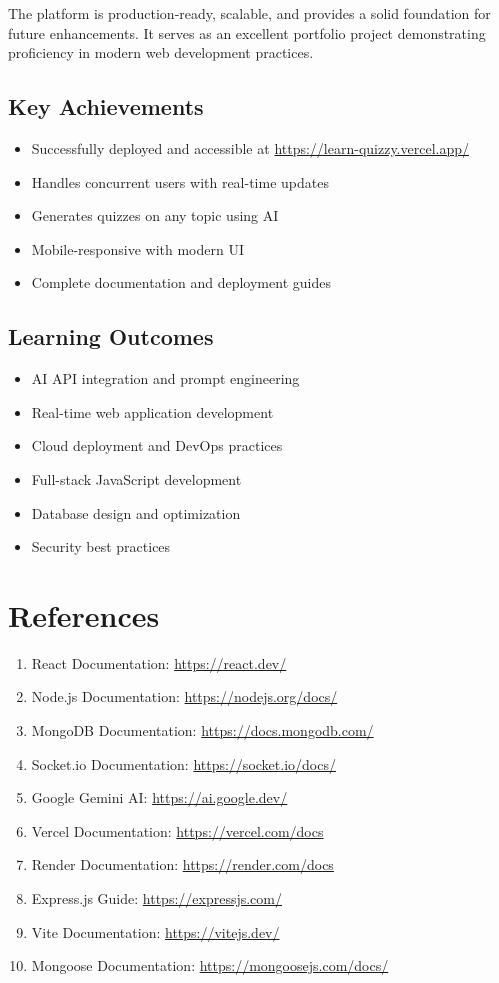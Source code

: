 \documentclass[12pt,a4paper]{article}
\begin{document}
The platform is production-ready, scalable, and provides a solid foundation for future enhancements. It serves as an excellent portfolio project demonstrating proficiency in modern web development practices.

\subsection{Key Achievements}
\begin{itemize}
    \item Successfully deployed and accessible at \url{https://learn-quizzy.vercel.app/}
    \item Handles concurrent users with real-time updates
    \item Generates quizzes on any topic using AI
    \item Mobile-responsive with modern UI
    \item Complete documentation and deployment guides
\end{itemize}

\subsection{Learning Outcomes}
\begin{itemize}
    \item AI API integration and prompt engineering
    \item Real-time web application development
    \item Cloud deployment and DevOps practices
    \item Full-stack JavaScript development
    \item Database design and optimization
    \item Security best practices
\end{itemize}

\newpage

\section{References}

\begin{enumerate}
    \item React Documentation: \url{https://react.dev/}
    \item Node.js Documentation: \url{https://nodejs.org/docs/}
    \item MongoDB Documentation: \url{https://docs.mongodb.com/}
    \item Socket.io Documentation: \url{https://socket.io/docs/}
    \item Google Gemini AI: \url{https://ai.google.dev/}
    \item Vercel Documentation: \url{https://vercel.com/docs}
    \item Render Documentation: \url{https://render.com/docs}
    \item Express.js Guide: \url{https://expressjs.com/}
    \item Vite Documentation: \url{https://vitejs.dev/}
    \item Mongoose Documentation: \url{https://mongoosejs.com/docs/}
\end{enumerate}
\end{document}
